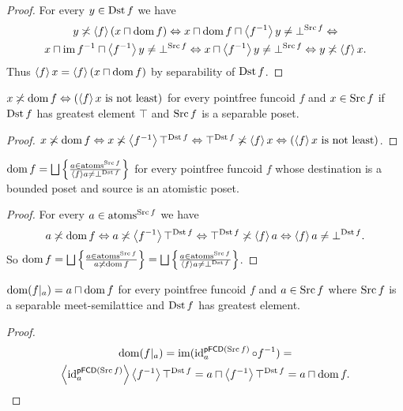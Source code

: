 \begin{proof}
For every $y\in\Dst f$ we have
\begin{multline*}
y\nasymp\supfun f(x\sqcap\dom f)\Leftrightarrow x\sqcap\dom f\sqcap\supfun{f^{-1}}y\ne\bot^{\Src f}\Leftrightarrow\\
x\sqcap\im f^{-1}\sqcap\supfun{f^{-1}}y\ne\bot^{\Src f}\Leftrightarrow x\sqcap\supfun{f^{-1}}y\ne\bot^{\Src f}\Leftrightarrow y\nasymp\supfun fx.
\end{multline*}
Thus $\supfun fx=\supfun f(x\sqcap\dom f)$ by separability of $\Dst f$.\end{proof}
\begin{prop}
$x\nasymp\dom f\Leftrightarrow(\supfun fx\text{ is not least})$ for
every pointfree funcoid $f$ and $x\in\Src f$ if $\Dst f$ has greatest
element $\top$ and $\Src f$ is a separable poset.\end{prop}
\begin{proof}
$x\nasymp\dom f\Leftrightarrow x\nasymp\supfun{f^{-1}}\top^{\Dst f}\Leftrightarrow\top^{\Dst f}\nasymp\supfun fx\Leftrightarrow(\supfun fx\text{ is not least})$.\end{proof}
\begin{prop}
$\dom f=\bigsqcup\setcond{a\in\atoms^{\Src f}}{\supfun fa\ne\bot^{\Dst f}}$
for every pointfree funcoid $f$ whose destination is a bounded poset
and source is an atomistic poset.\end{prop}
\begin{proof}
For every $a\in\atoms^{\Src f}$ we have 
\[
a\nasymp\dom f\Leftrightarrow a\nasymp\supfun{f^{-1}}\top^{\Dst f}\Leftrightarrow\top^{\Dst f}\nasymp\supfun fa\Leftrightarrow\supfun fa\ne\bot^{\Dst f}.
\]
So $\dom f=\bigsqcup\setcond{a\in\atoms^{\Src f}}{a\nasymp\dom f}=\bigsqcup\setcond{a\in\atoms^{\Src f}}{\supfun fa\ne\bot^{\Dst f}}$.\end{proof}
\begin{prop}
$\dom(f|_{a})=a\sqcap\dom f$ for every pointfree funcoid $f$ and
$a\in\Src f$ where $\Src f$ is a separable meet-semilattice and
$\Dst f$ has greatest element.\end{prop}
\begin{proof}
~
\begin{multline*}
\dom(f|_{a})=\im(\id_{a}^{\mathsf{pFCD}(\Src f)}\circ f^{-1})=\\
\supfun{\id_{a}^{\mathsf{pFCD}(\Src f)}}\supfun{f^{-1}}\top^{\Dst f}=a\sqcap\supfun{f^{-1}}\top^{\Dst f}=a\sqcap\dom f.
\end{multline*}
\end{proof}
